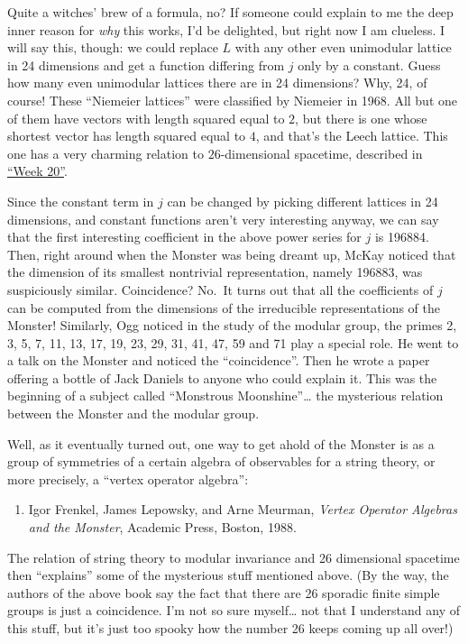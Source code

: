 \documentclass{article}
\def\tightlist{}
\begin{document}
Quite a witches' brew of a formula, no? If someone could explain to me
the deep inner reason for \emph{why} this works, I'd be delighted, but
right now I am clueless. I will say this, though: we could replace \(L\)
with any other even unimodular lattice in 24 dimensions and get a
function differing from \(j\) only by a constant. Guess how many even
unimodular lattices there are in 24 dimensions? Why, 24, of course!
These ``Niemeier lattices'' were classified by Niemeier in 1968. All but
one of them have vectors with length squared equal to \(2\), but there
is one whose shortest vector has length squared equal to \(4\), and
that's the Leech lattice. This one has a very charming relation to
\(26\)-dimensional spacetime, described in
\protect\hyperlink{week20}{``Week 20''}.

Since the constant term in \(j\) can be changed by picking different
lattices in 24 dimensions, and constant functions aren't very
interesting anyway, we can say that the first interesting coefficient in
the above power series for \(j\) is 196884. Then, right around when the
Monster was being dreamt up, McKay noticed that the dimension of its
smallest nontrivial representation, namely 196883, was suspiciously
similar. Coincidence? No.~It turns out that all the coefficients of
\(j\) can be computed from the dimensions of the irreducible
representations of the Monster! Similarly, Ogg noticed in the study of
the modular group, the primes 2, 3, 5, 7, 11, 13, 17, 19, 23, 29, 31,
41, 47, 59 and 71 play a special role. He went to a talk on the Monster
and noticed the ``coincidence''. Then he wrote a paper offering a bottle
of Jack Daniels to anyone who could explain it. This was the beginning
of a subject called ``Monstrous Moonshine''\ldots{} the mysterious
relation between the Monster and the modular group.

Well, as it eventually turned out, one way to get ahold of the Monster
is as a group of symmetries of a certain algebra of observables for a
string theory, or more precisely, a ``vertex operator algebra'':

\begin{enumerate}
\def\labelenumi{\arabic{enumi})}
\setcounter{enumi}{4}
\tightlist
\item
  Igor Frenkel, James Lepowsky, and Arne Meurman, \emph{Vertex Operator
  Algebras and the Monster}, Academic Press, Boston, 1988.
\end{enumerate}

The relation of string theory to modular invariance and 26 dimensional
spacetime then ``explains'' some of the mysterious stuff mentioned
above. (By the way, the authors of the above book say the fact that
there are 26 sporadic finite simple groups is just a coincidence. I'm
not so sure myself\ldots{} not that I understand any of this stuff, but
it's just too spooky how the number 26 keeps coming up all over!)
\end{document}
